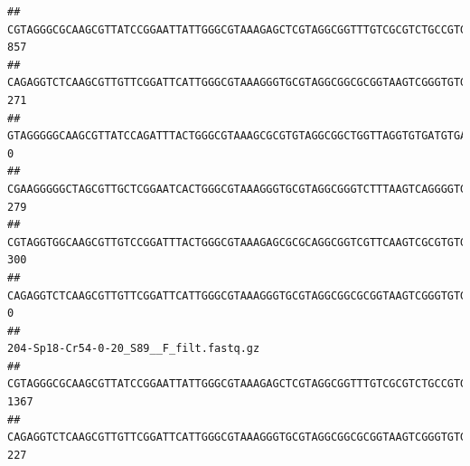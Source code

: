 \documentclass[]{article}
\begin{document}
\begin{verbatim}
## CGTAGGGCGCAAGCGTTATCCGGAATTATTGGGCGTAAAGAGCTCGTAGGCGGTTTGTCGCGTCTGCCGTGAAAGTCCGGGGCTCAACTCCGGATCTGCGGTGGGTACGGGCAGACTAGAGTGATGTAGGGGAGACTGGAATTCCTGGTGTAGCGGTGAAATGCGCAGATATCAGGAGGAACACCGATGGCGAAGGCAGGTCTCTGGGCATTAACTGACGCTGAGGAGCGAAAGCATGGGGAGCGAACA                                     857
## CAGAGGTCTCAAGCGTTGTTCGGATTCATTGGGCGTAAAGGGTGCGTAGGCGGCGCGGTAAGTCGGGTGTGAAATCTCGGAGCTTAACTCCGAAACTGCATTCGATACTGCCGTGCTTGAGGACTGGAGAGGAGACTGGAATTTACGGTGTAGCGGTGAAATGCGTAGATATCGTAAGGAAGACCAGTGGCGAAGGCGGGTCTCTGGACAGTTCCTGACGCTGAGGCACGAAGGCCAGGGGAGCAAACG                                     271
## GTAGGGGGCAAGCGTTATCCAGATTTACTGGGCGTAAAGCGCGTGTAGGCGGCTGGTTAGGTGTGATGTGAAATCTTCCGGCTCAACCGGAAAACTGCATTGCAAACCGGCCTGGCTAGAGTGCAGGAGAGGGAAGCGGAATTCCAGGTGTAGCGGTGAAATGCGTAGATATCTGGAGGAACACCAGTGGCGAAGGCGGCTTCCTGGCCTGCAACTGACGCTGAGACGCGAAAGCGTGGGGAGCGAAC                                        0
## CGAAGGGGGCTAGCGTTGCTCGGAATCACTGGGCGTAAAGGGTGCGTAGGCGGGTCTTTAAGTCAGGGGTGAAATCCTGGAGCTCAACTCCAGAACTGCCTTTGATACTGAAGATCTTGAGTTCGGGAGAGGTGAGTGGAACTGCGAGTGTAGAGGTGAAATTCGTAGATATTCGCAAGAACACCAGTGGCGAAGGCGGCTCACTGGCCCGATACTGACGCTGAGGCACGAAAGCGTGGGGAGCAAACA                                     279
## CGTAGGTGGCAAGCGTTGTCCGGATTTACTGGGCGTAAAGAGCGCGCAGGCGGTCGTTCAAGTCGCGTGTGAAAGCCCCCGGCTCAACTGGGGAGGGTCACGCGATACTGATCGACTCGAAGGCAGGAGAGGGTAGTGGAATTCCCGGTGTAGTGGTGAAATGCGTAGATATCGGGAGGAACACCAGTGGCGAAGGCGACTACCTGGCCTGTTCTTGACGCTGAGGCGCGAAAGCTAGGGGAGCAAACG                                     300
## CAGAGGTCTCAAGCGTTGTTCGGATTCATTGGGCGTAAAGGGTGCGTAGGCGGCGCGGTAAGTCGGGTGTGAAATCTCGGGGCTTAACTCCGAAACTGCATTCGATACTGCCGTGCTTGAGGACTGGAGAGGAGACTGGAATTTACGGTGTAGCGGTGAAATGCGTAGATATCGTAAGGAAGACCAGTGGCGAAGGCGGGTCTCTGGACAGTTCCTGACGCTGAGGCACGAAGGCCAGGGGAGCAAACG                                       0
##                                                                                                                                                                                                                                                           204-Sp18-Cr54-0-20_S89__F_filt.fastq.gz
## CGTAGGGCGCAAGCGTTATCCGGAATTATTGGGCGTAAAGAGCTCGTAGGCGGTTTGTCGCGTCTGCCGTGAAAGTCCGGGGCTCAACTCCGGATCTGCGGTGGGTACGGGCAGACTAGAGTGATGTAGGGGAGACTGGAATTCCTGGTGTAGCGGTGAAATGCGCAGATATCAGGAGGAACACCGATGGCGAAGGCAGGTCTCTGGGCATTAACTGACGCTGAGGAGCGAAAGCATGGGGAGCGAACA                                    1367
## CAGAGGTCTCAAGCGTTGTTCGGATTCATTGGGCGTAAAGGGTGCGTAGGCGGCGCGGTAAGTCGGGTGTGAAATCTCGGAGCTTAACTCCGAAACTGCATTCGATACTGCCGTGCTTGAGGACTGGAGAGGAGACTGGAATTTACGGTGTAGCGGTGAAATGCGTAGATATCGTAAGGAAGACCAGTGGCGAAGGCGGGTCTCTGGACAGTTCCTGACGCTGAGGCACGAAGGCCAGGGGAGCAAACG                                     227

\end{verbatim}
\end{document}
